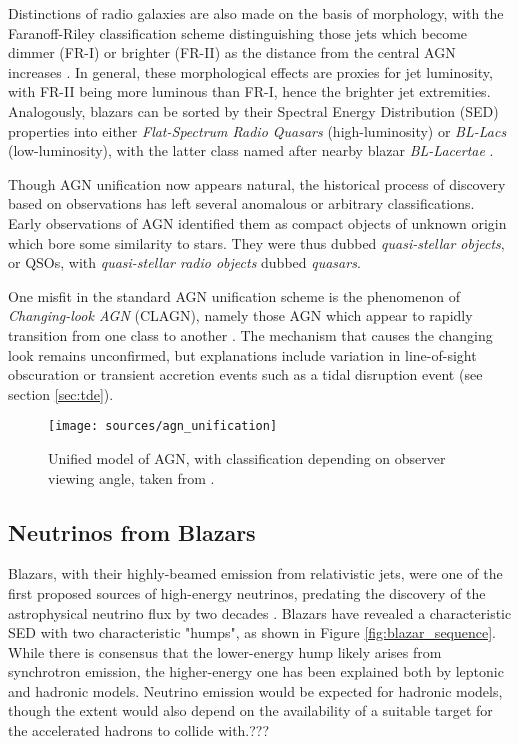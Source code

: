 Distinctions of radio galaxies are also made on the basis of morphology, with the Faranoff-Riley classification scheme distinguishing those jets which become dimmer (FR-I) or brighter (FR-II) as the distance from the central AGN increases . In general, these morphological effects are proxies for jet luminosity, with FR-II being more luminous than FR-I, hence the brighter jet extremities. Analogously, blazars can be sorted by their Spectral Energy Distribution (SED) properties into either \emph{Flat-Spectrum Radio Quasars} (high-luminosity) or \emph{BL-Lacs} (low-luminosity), with the latter class named after nearby blazar \emph{BL-Lacertae} .

Though AGN unification now appears natural, the historical process of discovery based on observations has left several anomalous or arbitrary classifications. Early observations of AGN identified them as compact objects of unknown origin which bore some similarity to stars. They were thus dubbed \emph{quasi-stellar objects}, or QSOs, with \emph{quasi-stellar radio objects} dubbed \emph{quasars}. 

One misfit in the standard AGN unification scheme is the phenomenon of \emph{Changing-look AGN} (CLAGN), namely those AGN which appear to rapidly transition from one class to another . The mechanism that causes the changing look remains unconfirmed, but explanations include variation in line-of-sight obscuration or transient accretion events such as a tidal disruption event (see section \ref{sec:tde}).

\begin{figure}[!ht]
	\centering \texttt{[image: sources/agn\_unification]}
	\caption{Unified model of AGN, with classification depending on observer viewing angle, taken from \cite{2012agn..book.....B}.}
	\label{fig:agn_unification}
\end{figure}

\subsection{Neutrinos from Blazars}
Blazars, with their highly-beamed emission from relativistic jets, were one of the first proposed sources of high-energy neutrinos, predating the discovery of the astrophysical neutrino flux by two decades . Blazars have revealed a characteristic SED with two characteristic "humps", as shown in Figure \ref{fig:blazar_sequence}. While there is consensus that the lower-energy hump likely arises from synchrotron emission,  the higher-energy one has been explained both by leptonic and hadronic models. Neutrino emission would be expected for hadronic models, though the extent would also depend on the availability of a suitable target for the accelerated hadrons to collide with.???

